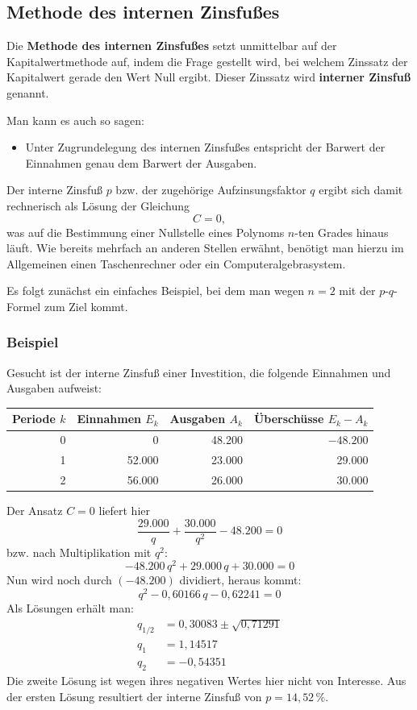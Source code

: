 \subsection{Methode des internen Zinsfußes}

Die \textbf{Methode des internen Zinsfußes} setzt unmittelbar auf der Kapitalwertmethode auf, indem die Frage gestellt wird, bei welchem Zinssatz der Kapitalwert gerade den Wert Null ergibt. Dieser Zinssatz wird \textbf{interner Zinsfuß} genannt.

Man kann es auch so sagen:
\begin{itemize}
  \item Unter Zugrundelegung des internen Zinsfußes entspricht der Barwert der Einnahmen genau dem Barwert der Ausgaben.
\end{itemize}

Der interne Zinsfuß $p$ bzw. der zugehörige Aufzinsungsfaktor $q$ ergibt sich damit rechnerisch als Lösung der Gleichung
\[ C = 0 , \]
was auf die Bestimmung einer Nullstelle eines Polynoms $n$-ten Grades hinaus läuft. Wie bereits mehrfach an anderen Stellen erwähnt, benötigt man hierzu im Allgemeinen einen Taschenrechner oder ein Computeralgebrasystem.

Es folgt zunächst ein einfaches Beispiel, bei dem man wegen $n = 2$ mit der $p$-$q$-Formel zum Ziel kommt.

\subsubsection{Beispiel}

Gesucht ist der interne Zinsfuß einer Investition, die folgende Einnahmen und Ausgaben aufweist:

\begin{center}
  \centering
  \begin{tabular}{rrrr}
    \hline
    Periode $k$ & Einnahmen $E_k$ & Ausgaben $A_k$ & Überschüsse $E_k - A_k$\\
    \hline
    0 & 0 & 48.200 & $-48.200$\\
    1 & 52.000 & 23.000 & 29.000\\
    2 & 56.000 & 26.000 & 30.000\\
    \hline
  \end{tabular}
\end{center}

Der Ansatz $C = 0$ liefert hier
\[ \frac{29.000}{q} + \frac{30.000}{q^2} - 48.200 = 0 \]
bzw. nach Multiplikation mit $q^2$:
\[ -48.200\,q^2 + 29.000\,q + 30.000 = 0 \]
Nun wird noch durch $(-48.200)$ dividiert, heraus kommt:
\[ q^2 - 0{,}60166\,q - 0{,}62241 = 0 \]
Als Lösungen erhält man:
\begin{align*}
  q_{1/2} &= 0{,}30083 \pm \sqrt{0{,}71291}\\
  q_1 &= 1{,}14517\\
  q_2 &= -0{,}54351
\end{align*}
Die zweite Lösung ist wegen ihres negativen Wertes hier nicht von Interesse. Aus der ersten Lösung resultiert der interne Zinsfuß von $p = 14{,}52\,\%$.\beispielende

